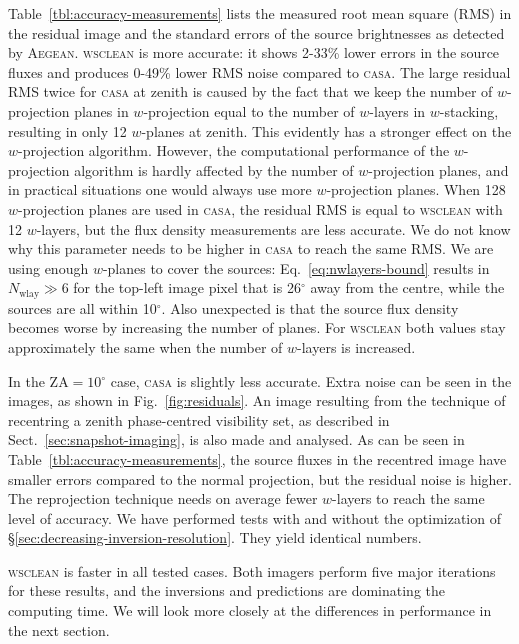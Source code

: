 \documentclass[useAMS,usenatbib]{mn2e}
\newcommand{\degree}{\ensuremath{^{\circ}}\xspace}
\begin{document}
Table~\ref{tbl:accuracy-measurements} lists the measured root mean square (RMS) in the residual image and the standard errors of the source brightnesses as detected by \textsc{Aegean}. \textsc{wsclean} is more accurate: it shows 2-33\% lower errors in the source fluxes and produces 0-49\% lower RMS noise compared to \textsc{casa}. The large residual RMS twice for \textsc{casa} at zenith is caused by the fact that we keep the number of $w$-projection planes in $w$-projection equal to the number of $w$-layers in $w$-stacking, resulting in only 12 $w$-planes at zenith. This evidently has a stronger effect on the $w$-projection algorithm. However, the computational performance of the $w$-projection algorithm is hardly affected by the number of $w$-projection planes, and in practical situations one would always use more $w$-projection planes. When 128 $w$-projection planes are used in \textsc{casa}, the residual RMS is equal to \textsc{wsclean} with 12 $w$-layers, but the flux density measurements are less accurate. We do not know why this parameter needs to be higher in \textsc{casa} to reach the same RMS. We are using enough $w$-planes to cover the sources: Eq.~\eqref{eq:nwlayers-bound} results in $N_\textrm{wlay}\gg 6$ for the top-left image pixel that is 26\degree away from the centre, while the sources are all within 10\degree. Also unexpected is that the source flux density becomes worse by increasing the number of planes. For \textsc{wsclean} both values stay approximately the same when the number of $w$-layers is increased.

In the $\textrm{ZA}=10\degree$ case, \textsc{casa} is slightly less accurate. Extra noise can be seen in the images, as shown in Fig.~\ref{fig:residuals}. An image resulting from the technique of recentring a zenith phase-centred visibility set, as described in Sect.~\ref{sec:snapshot-imaging}, is also made and analysed. As can be seen in Table~\ref{tbl:accuracy-measurements}, the source fluxes in the recentred image have smaller errors compared to the normal projection, but the residual noise is higher. The reprojection technique needs on average fewer $w$-layers to reach the same level of accuracy. We have performed tests with and without the optimization of \S\ref{sec:decreasing-inversion-resolution}. They yield identical numbers.

\textsc{wsclean} is faster in all tested cases. Both imagers perform five major iterations for these results, and the inversions and predictions are dominating the computing time. We will look more closely at the differences in performance in the next section.
\end{document}
